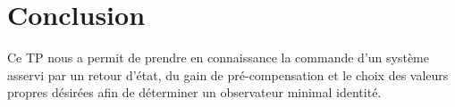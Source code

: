 \chapter*{Conclusion}
Ce TP nous a permit de prendre en connaissance la commande d'un système asservi par un retour d'état, du gain de pré-compensation et le choix des valeurs propres désirées afin de déterminer un observateur minimal identité.
